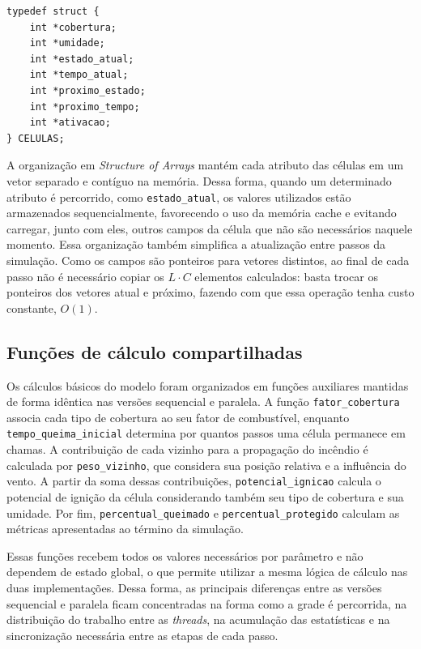\documentclass[11pt,a4paper]{article}
\begin{document}
\begin{lstlisting}[caption={Estrutura de dados da grade (\emph{Structure of Arrays}).},label={lst:celulas}]
typedef struct {
    int *cobertura;
    int *umidade;
    int *estado_atual;
    int *tempo_atual;
    int *proximo_estado;
    int *proximo_tempo;
    int *ativacao;
} CELULAS;
\end{lstlisting}

A organização em \emph{Structure of Arrays} mantém cada atributo das células em um vetor separado e contíguo na memória. Dessa forma, quando um determinado atributo é percorrido, como \texttt{estado\_atual}, os valores utilizados estão armazenados sequencialmente, favorecendo o uso da memória cache e evitando carregar, junto com eles, outros campos da célula que não são necessários naquele momento. Essa organização também simplifica a atualização entre passos da simulação. Como os campos são ponteiros para vetores distintos, ao final de cada passo não é necessário copiar os $L \cdot C$ elementos calculados: basta trocar os ponteiros dos vetores atual e próximo, fazendo com que essa operação tenha custo constante, $O(1)$.

\subsection{Funções de cálculo compartilhadas}
\label{sec:funcoes-compartilhadas}

Os cálculos básicos do modelo foram organizados em funções auxiliares mantidas de forma idêntica nas versões sequencial e paralela. A função \texttt{fator\_cobertura} associa cada tipo de cobertura ao seu fator de combustível, enquanto \texttt{tempo\_queima\_inicial} determina por quantos passos uma célula permanece em chamas. A contribuição de cada vizinho para a propagação do incêndio é calculada por \texttt{peso\_vizinho}, que considera sua posição relativa e a influência do vento. A partir da soma dessas contribuições, \texttt{potencial\_ignicao} calcula o potencial de ignição da célula considerando também seu tipo de cobertura e sua umidade. Por fim, \texttt{percentual\_queimado} e \texttt{percentual\_protegido} calculam as métricas apresentadas ao término da simulação.

Essas funções recebem todos os valores necessários por parâmetro e não dependem de estado global, o que permite utilizar a mesma lógica de cálculo nas duas implementações. Dessa forma, as principais diferenças entre as versões sequencial e paralela ficam concentradas na forma como a grade é percorrida, na distribuição do trabalho entre as \emph{threads}, na acumulação das estatísticas e na sincronização necessária entre as etapas de cada passo.
\end{document}
